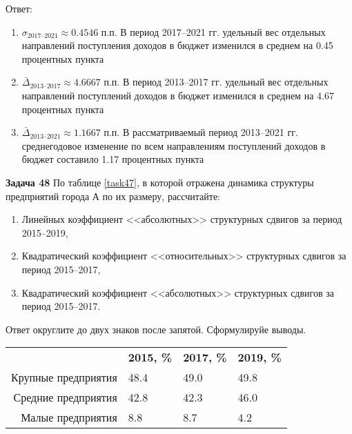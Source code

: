 \documentclass{article}
\begin{document}
Ответ: \begin{enumerate} \item $\sigma_\text{2017--2021}\approx 0.4546$ п.п. В период 2017--2021 гг. удельный вес отдельных направлений поступления доходов в бюджет изменился в среднем на 0.45 процентных пункта
\item $\bar\Delta_\text{2013--2017}\approx 4.6667$ п.п. В период 2013--2017 гг. удельный вес отдельных направлений поступлений доходов в бюджет изменился в среднем на 4.67 процентных пункта\item $\bar\Delta_\text{2013--2021}\approx 1.1667$ п.п. В рассматриваемый период 2013--2021 гг. среднегодовое изменение по всем направлениям поступлений доходов в бюджет составило 1.17 процентных пункта\\\end{enumerate}

\textbf{Задача 48} По таблице \ref{task47}, в которой отражена динамика структуры предприятий города А по их размеру, рассчитайте:
\begin{enumerate}[leftmargin=40pt]
\item Линейных коэффициент <<абсолютных>> структурных сдвигов за период 2015--2019,
\item Квадратический коэффициент <<относительных>> структурных сдвигов за период 2015--2017,
\item Квадратический коэффициент <<абсолютных>> структурных сдвигов за период 2015--2017.\medskip
\end{enumerate}

Ответ округлите до двух знаков после запятой. Сформулируйе выводы.\\

\begin{minipage}{\textwidth}
\centering
\begin{tabularx}{0.8\textwidth}{rYYY}
\toprule
 & \textbf{2015, \%} & \textbf{2017, \%} & \textbf{2019, \%} \\
\cmidrule(lr){2-2}\cmidrule(lr){3-3}\cmidrule(lr){4-4}
Крупные предприятия & 48.4 & 49.0 & 49.8 \\

Средние предприятия & 42.8 & 42.3 & 46.0 \\

Малые предприятия & 8.8 & 8.7 & 4.2 \\
\bottomrule
\end{tabularx}
\label{task1}
\end{minipage} \\[35pt]
\end{document}
